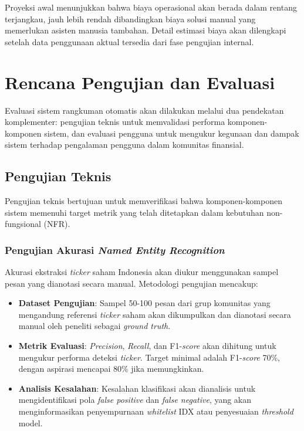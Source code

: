 Proyeksi awal menunjukkan bahwa biaya operasional akan berada dalam rentang terjangkau, jauh lebih rendah dibandingkan biaya solusi manual yang memerlukan asisten manusia tambahan. Detail estimasi biaya akan dilengkapi setelah data penggunaan aktual tersedia dari fase pengujian internal.


\section{Rencana Pengujian dan Evaluasi}
\label{sec:rencana-evaluasi}

Evaluasi sistem rangkuman otomatis akan dilakukan melalui dua pendekatan komplementer: pengujian teknis untuk memvalidasi performa komponen-komponen sistem, dan evaluasi pengguna untuk mengukur kegunaan dan dampak sistem terhadap pengalaman pengguna dalam komunitas finansial.

\subsection{Pengujian Teknis}

Pengujian teknis bertujuan untuk memverifikasi bahwa komponen-komponen sistem memenuhi target metrik yang telah ditetapkan dalam kebutuhan non-fungsional (NFR).

\subsubsection{Pengujian Akurasi \textit{Named Entity Recognition}}

Akurasi ekstraksi \textit{ticker} saham Indonesia akan diukur menggunakan sampel pesan yang dianotasi secara manual. Metodologi pengujian mencakup:

\begin{itemize}
\item \textbf{Dataset Pengujian}: Sampel 50-100 pesan dari grup komunitas yang mengandung referensi \textit{ticker} saham akan dikumpulkan dan dianotasi secara manual oleh peneliti sebagai \textit{ground truth}.

\item \textbf{Metrik Evaluasi}: \textit{Precision}, \textit{Recall}, dan F1-\textit{score} akan dihitung untuk mengukur performa deteksi \textit{ticker}. Target minimal adalah F1-\textit{score} 70\%, dengan aspirasi mencapai 80\% jika memungkinkan.

\item \textbf{Analisis Kesalahan}: Kesalahan klasifikasi akan dianalisis untuk mengidentifikasi pola \textit{false positive} dan \textit{false negative}, yang akan menginformasikan penyempurnaan \textit{whitelist} IDX atau penyesuaian \textit{threshold} model.
\end{itemize}

